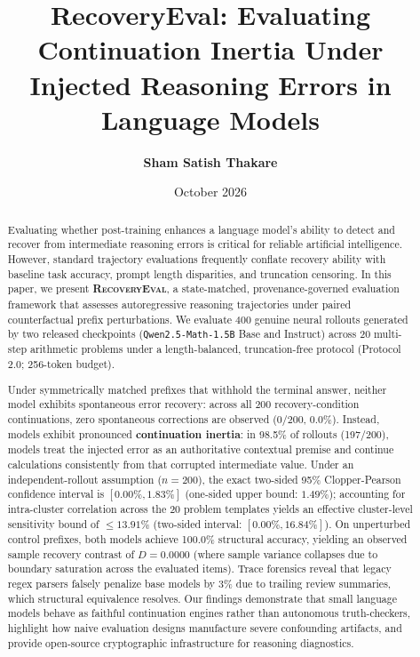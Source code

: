 \documentclass[11pt,letterpaper]{article}
\title{\textbf{\Large RecoveryEval: Evaluating Continuation Inertia Under Injected Reasoning Errors in Language Models}}
\author{\textbf{Sham Satish Thakare}}
\affil{Independent Researcher, Pune, Maharashtra, India \\ \texttt{shamthakare@gmail.com}}
\date{October 2026}
\newcommand{\modelbase}{\texttt{Qwen2.5-Math-1.5B}}
\newcommand{\framework}{\textsc{RecoveryEval}}
\begin{document}
\maketitle

\begin{abstract}
Evaluating whether post-training enhances a language model's ability to detect and recover from intermediate reasoning errors is critical for reliable artificial intelligence. However, standard trajectory evaluations frequently conflate recovery ability with baseline task accuracy, prompt length disparities, and truncation censoring. In this paper, we present \textbf{\framework}, a state-matched, provenance-governed evaluation framework that assesses autoregressive reasoning trajectories under paired counterfactual prefix perturbations. We evaluate 400 genuine neural rollouts generated by two released checkpoints (\modelbase{} Base and Instruct) across 20 multi-step arithmetic problems under a length-balanced, truncation-free protocol (Protocol 2.0; 256-token budget).

Under symmetrically matched prefixes that withhold the terminal answer, neither model exhibits spontaneous error recovery: across all 200 recovery-condition continuations, zero spontaneous corrections are observed ($0/200$, $0.0\%$). Instead, models exhibit pronounced \textbf{continuation inertia}: in 98.5\% of rollouts (197/200), models treat the injected error as an authoritative contextual premise and continue calculations consistently from that corrupted intermediate value. Under an independent-rollout assumption ($n=200$), the exact two-sided 95\% Clopper-Pearson confidence interval is $[0.00\%, 1.83\%]$ (one-sided upper bound: $1.49\%$); accounting for intra-cluster correlation across the 20 problem templates yields an effective cluster-level sensitivity bound of $\le 13.91\%$ (two-sided interval: $[0.00\%, 16.84\%]$). On unperturbed control prefixes, both models achieve 100.0\% structural accuracy, yielding an observed sample recovery contrast of $D = 0.0000$ (where sample variance collapses due to boundary saturation across the evaluated items). Trace forensics reveal that legacy regex parsers falsely penalize base models by 3\% due to trailing review summaries, which structural equivalence resolves. Our findings demonstrate that small language models behave as faithful continuation engines rather than autonomous truth-checkers, highlight how naive evaluation designs manufacture severe confounding artifacts, and provide open-source cryptographic infrastructure for reasoning diagnostics.
\end{abstract}
\end{document}
